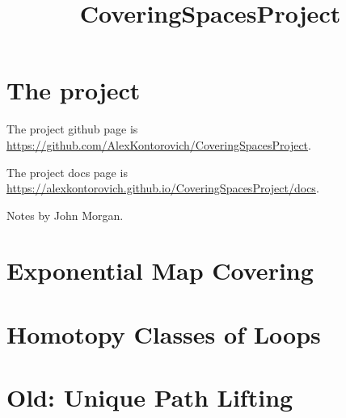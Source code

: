 \usepackage{amsmath, amsthm}
\usepackage{hyperref}

\theoremstyle{definition}
\newtheorem{definition}{Definition}
\newtheorem{theorem}{Theorem}
\newtheorem{proposition}{Proposition}
\newtheorem{lemma}{Lemma}
\newtheorem{corollary}{Corollary}

\title{CoveringSpacesProject}

\newcommand{\eps}{\epsilon}

\newcommand{\R}{\mathbb{R}}
\newcommand{\Q}{\mathbb{Q}}
\newcommand{\C}{\mathbb{C}}
\newcommand{\Z}{\mathbb{Z}}
\newcommand{\N}{\mathbb{N}}



\maketitle

\chapter{The project}

The project github page is \url{https://github.com/AlexKontorovich/CoveringSpacesProject}.

The project docs page is \url{https://alexkontorovich.github.io/CoveringSpacesProject/docs}.

Notes by John Morgan.

\chapter{Exponential Map Covering}


\chapter{Homotopy Classes of Loops}


\chapter{Old: Unique Path Lifting}


%
%


